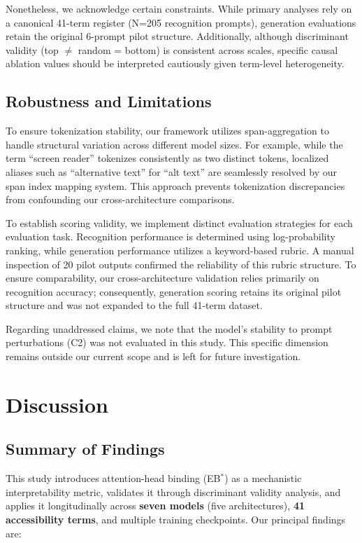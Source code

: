 \documentclass[10pt]{article} %
\begin{document}
Nonetheless, we acknowledge certain constraints. While primary analyses rely on a canonical 41-term register (N=205 recognition prompts), generation evaluations retain the original 6-prompt pilot structure. Additionally, although discriminant validity (top $\neq$ random = bottom) is consistent across scales, specific causal ablation values should be interpreted cautiously given term-level heterogeneity.

\subsection{Robustness and Limitations}

To ensure tokenization stability, our framework utilizes span-aggregation to handle structural variation across different model sizes. For example, while the term ``screen reader'' tokenizes consistently as two distinct tokens, localized aliases such as ``alternative text'' for ``alt text'' are seamlessly resolved by our span index mapping system. This approach prevents tokenization discrepancies from confounding our cross-architecture comparisons.

To establish scoring validity, we implement distinct evaluation strategies for each evaluation task. Recognition performance is determined using log-probability ranking, while generation performance utilizes a keyword-based rubric. A manual inspection of 20 pilot outputs confirmed the reliability of this rubric structure. To ensure comparability, our cross-architecture validation relies primarily on recognition accuracy; consequently, generation scoring retains its original pilot structure and was not expanded to the full 41-term dataset.

Regarding unaddressed claims, we note that the model's stability to prompt perturbations (C2) was not evaluated in this study. This specific dimension remains outside our current scope and is left for future investigation.

\section{Discussion}

\subsection{Summary of Findings}

This study introduces attention-head binding (EB$^*$) as a mechanistic interpretability metric, validates it through discriminant validity analysis, and applies it longitudinally across \textbf{seven models} (five architectures), \textbf{41 accessibility terms}, and multiple training checkpoints.
Our principal findings are:
\end{document}
